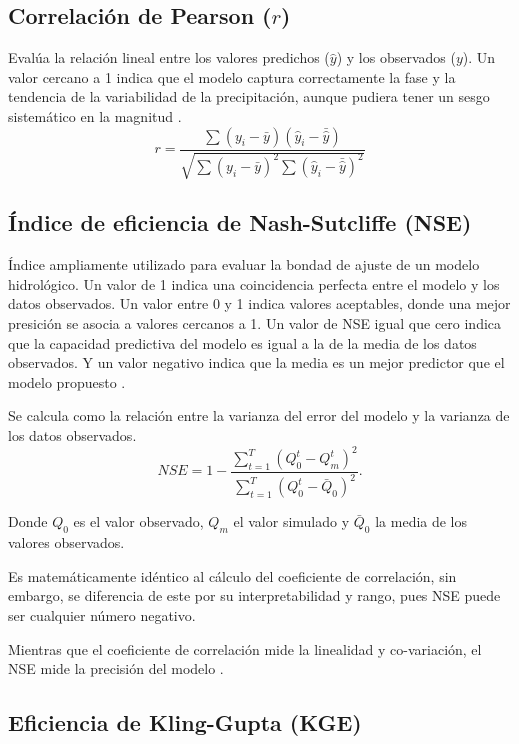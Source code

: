 \subsection{Correlación de Pearson (\(r\))}
Evalúa la relación lineal entre los valores predichos (\(\hat{y}\)) y los observados (\(y\)). Un valor cercano a 1 indica que el modelo captura correctamente la fase y la tendencia de la variabilidad de la precipitación, aunque pudiera tener un sesgo sistemático en la magnitud \citep{lalinde2018uso}.
\begin{equation}
    r = \frac{\sum (y_i - \bar{y})(\hat{y}_i - \bar{\hat{y}})}{\sqrt{\sum (y_i - \bar{y})^2 \sum (\hat{y}_i - \bar{\hat{y}})^2}}
\end{equation}

\subsection{Índice de eficiencia de Nash-Sutcliffe (NSE)}
Índice ampliamente utilizado para evaluar la bondad de ajuste de un modelo hidrológico. Un valor de 1 indica una coincidencia perfecta entre el modelo y los datos observados. Un valor entre 0 y 1 indica valores aceptables, donde una mejor presición se asocia a valores cercanos a 1. Un valor de NSE igual que cero indica que la capacidad predictiva del modelo es igual a la de la media de los datos observados. Y un valor negativo indica que la media es un mejor predictor que el modelo propuesto \citep{RITTER201333}.

Se calcula como la relación entre la varianza del error del modelo y la varianza de los datos observados.
\begin{equation}
    NSE = 1 - \frac{\sum_{t=1}^T(Q_0^t-Q_m^t)^2}{\sum_{t=1}^T(Q_0^t-\bar{Q}_0)^2}.
\end{equation}

Donde $Q_0$ es el valor observado, $Q_m$ el valor simulado y $\bar{Q}_0$ la media de los valores observados. 

Es matemáticamente idéntico al cálculo del coeficiente de correlación, sin embargo, se diferencia de este por su interpretabilidad y rango, pues NSE puede ser cualquier número negativo. 

Mientras que el coeficiente de correlación mide la linealidad y co-variación, el NSE mide la precisión del modelo .

\subsection{Eficiencia de Kling-Gupta (KGE)}

